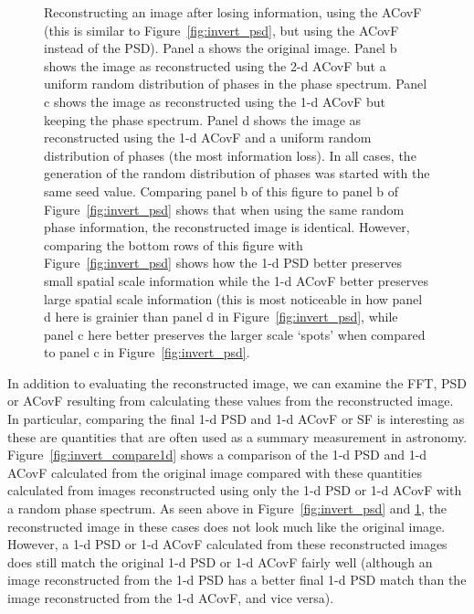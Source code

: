 \documentclass[11pt,preprint]{aastex}
\begin{document}
\begin{figure}[htpb]
\caption{{\small
Reconstructing an image after losing information, using the ACovF (this is similar to Figure~\ref{fig:invert_psd}, but using the ACovF instead of the PSD).  
Panel a shows the original image. Panel b shows the image as reconstructed using the 2-d ACovF but a uniform random distribution of phases in the phase spectrum. Panel c shows the image as reconstructed using the 1-d ACovF but keeping the phase spectrum. Panel d shows the image as reconstructed using the 1-d ACovF and a uniform random distribution of phases (the most information loss).  In all cases, the generation of the random distribution of phases was started with the same seed value. Comparing panel b of this figure to panel b of Figure~\ref{fig:invert_psd} shows that when using the same random phase information, the reconstructed image is identical. However, comparing the bottom rows of this figure with Figure~\ref{fig:invert_psd} shows how the 1-d PSD better preserves small spatial scale information while the 1-d ACovF better preserves large spatial scale information (this is most noticeable in how panel d here is grainier than panel d in Figure~\ref{fig:invert_psd}, while panel c here better preserves the larger scale `spots' when compared to panel c in Figure~\ref{fig:invert_psd}.}}
\label{fig:invert_ACovF}
\end{figure}

In addition to evaluating the reconstructed image, we can examine the FFT, PSD or ACovF resulting from calculating these values from the reconstructed image. In particular, comparing the final 1-d PSD and 1-d ACovF or SF is interesting as these are quantities that are often used as a summary measurement in astronomy. Figure~\ref{fig:invert_compare1d} shows a comparison of the 1-d PSD and 1-d ACovF calculated from the original image compared with these quantities calculated from images reconstructed using only the 1-d PSD or 1-d ACovF with a random phase spectrum. As seen above in Figure~\ref{fig:invert_psd} and \ref{fig:invert_ACovF}, the reconstructed image in these cases does not look much like the original image. However, a 1-d PSD or 1-d ACovF calculated from these reconstructed images does still match the original 1-d PSD or 1-d ACovF fairly well (although an image reconstructed from the 1-d PSD has a better final 1-d PSD match than the image reconstructed from the 1-d ACovF, and vice versa). 
\end{document}
